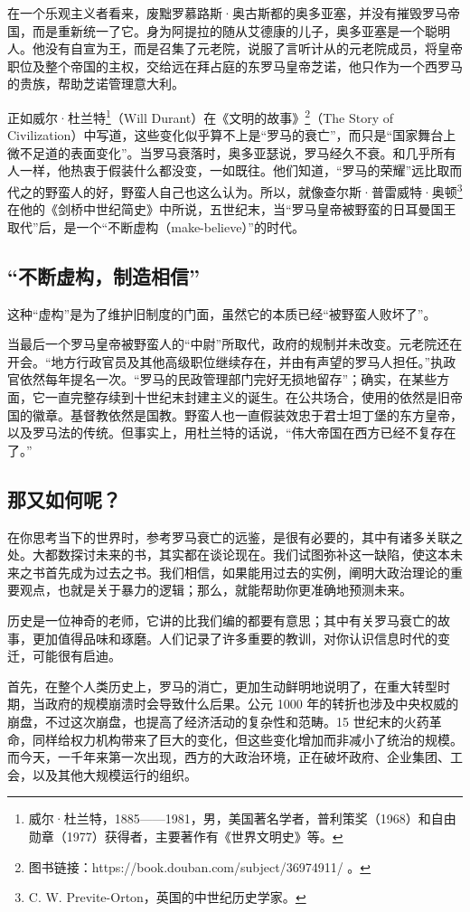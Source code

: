 在一个乐观主义者看来，废黜罗慕路斯·奥古斯都的奥多亚塞，并没有摧毁罗马帝国，而是重新统一了它。身为阿提拉的随从艾德康的儿子，奥多亚塞是一个聪明人。他没有自宣为王，而是召集了元老院，说服了言听计从的元老院成员，将皇帝职位及整个帝国的主权，交给远在拜占庭的东罗马皇帝芝诺，他只作为一个西罗马的贵族，帮助芝诺管理意大利。

正如威尔·杜兰特\footnote{威尔·杜兰特，1885——1981，男，美国著名学者，普利策奖（1968）和自由勋章（1977）获得者，主要著作有《世界文明史》等。}（Will Durant）在《文明的故事》\footnote{图书链接：https://book.douban.com/subject/36974911/ 。}（The Story of Civilization）中写道，这些变化似乎算不上是“罗马的衰亡”，而只是“国家舞台上微不足道的表面变化”。当罗马衰落时，奥多亚瑟说，罗马经久不衰。和几乎所有人一样，他热衷于假装什么都没变，一如既往。他们知道，“罗马的荣耀”远比取而代之的野蛮人的好，野蛮人自己也这么认为。所以，就像查尔斯·普雷威特·奥顿\footnote{C. W. Previte-Orton，英国的中世纪历史学家。}在他的《剑桥中世纪简史》中所说，五世纪末，当“罗马皇帝被野蛮的日耳曼国王取代”后，是一个“不断虚构（make-believe）”的时代。

\subsection{“不断虚构，制造相信”}
这种“虚构”是为了维护旧制度的门面，虽然它的本质已经“被野蛮人败坏了”。

当最后一个罗马皇帝被野蛮人的“中尉”所取代，政府的规制并未改变。元老院还在开会。“地方行政官员及其他高级职位继续存在，并由有声望的罗马人担任。”执政官依然每年提名一次。“罗马的民政管理部门完好无损地留存”；确实，在某些方面，它一直完整存续到十世纪末封建主义的诞生。在公共场合，使用的依然是旧帝国的徽章。基督教依然是国教。野蛮人也一直假装效忠于君士坦丁堡的东方皇帝，以及罗马法的传统。但事实上，用杜兰特的话说，“伟大帝国在西方已经不复存在了。”

\subsection{那又如何呢？}
在你思考当下的世界时，参考罗马衰亡的远鉴，是很有必要的，其中有诸多关联之处。大都数探讨未来的书，其实都在谈论现在。我们试图弥补这一缺陷，使这本未来之书首先成为过去之书。我们相信，如果能用过去的实例，阐明大政治理论的重要观点，也就是关于暴力的逻辑；那么，就能帮助你更准确地预测未来。

历史是一位神奇的老师，它讲的比我们编的都要有意思；其中有关罗马衰亡的故事，更加值得品味和琢磨。人们记录了许多重要的教训，对你认识信息时代的变迁，可能很有启迪。

首先，在整个人类历史上，罗马的消亡，更加生动鲜明地说明了，在重大转型时期，当政府的规模崩溃时会导致什么后果。公元 1000 年的转折也涉及中央权威的崩盘，不过这次崩盘，也提高了经济活动的复杂性和范畴。15 世纪末的火药革命，同样给权力机构带来了巨大的变化，但这些变化增加而非减小了统治的规模。而今天，一千年来第一次出现，西方的大政治环境，正在破坏政府、企业集团、工会，以及其他大规模运行的组织。


